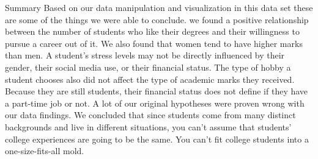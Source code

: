 \documentclass[
  ignorenonframetext,
]{beamer}
\begin{document}
\begin{frame}{Summary}
\protect\hypertarget{summary}{}
Based on our data manipulation and visualization in this data set these
are some of the things we were able to conclude. we found a positive
relationship between the number of students who like their degrees and
their willingness to pursue a career out of it. We also found that women
tend to have higher marks than men. A student's stress levels may not be
directly influenced by their gender, their social media use, or their
financial status. The type of hobby a student chooses also did not
affect the type of academic marks they received. Because they are still
students, their financial status does not define if they have a
part-time job or not. A lot of our original hypotheses were proven wrong
with our data findings. We concluded that since students come from many
distinct backgrounds and live in different situations, you can't assume
that students' college experiences are going to be the same. You can't
fit college students into a one-size-fits-all mold.~
\end{frame}
\end{document}
